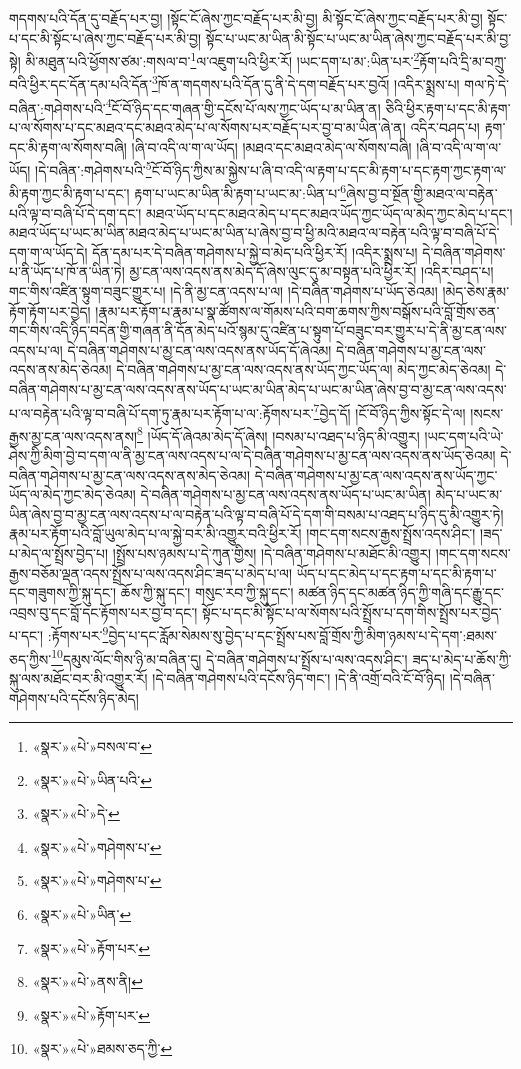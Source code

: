 གདགས་པའི་དོན་དུ་བརྗོད་པར་བྱ། །སྟོང་ངོ་ཞེས་ཀྱང་བརྗོད་པར་མི་བྱ། མི་སྟོང་ངོ་ཞེས་ཀྱང་བརྗོད་པར་མི་བྱ། སྟོང་པ་དང་མི་སྟོང་པ་ཞེས་ཀྱང་བརྗོད་པར་མི་བྱ། སྟོང་པ་ཡང་མ་ཡིན་མི་སྟོང་པ་ཡང་མ་ཡིན་ཞེས་ཀྱང་བརྗོད་པར་མི་བྱ་སྟེ། མི་མཐུན་པའི་ཕྱོགས་ཙམ་:གསལ་བ་\footnote{«སྣར་»«པེ་»བསལ་བ་}ལ་འཇུག་པའི་ཕྱིར་རོ། །ཡང་དག་པ་མ་:ཡིན་པར་\footnote{«སྣར་»«པེ་»ཡིན་པའི་}རྟོག་པའི་དྲི་མ་བཀྲུ་བའི་ཕྱིར་དང་དོན་དམ་པའི་དོན་\footnote{«སྣར་»«པེ་»དེ་}ཁོ་ན་གདགས་པའི་དོན་དུ་ནི་དེ་དག་བརྗོད་པར་བྱའོ། །འདིར་སྨྲས་པ། གལ་ཏེ་དེ་བཞིན་:གཤེགས་པའི་\footnote{«སྣར་»«པེ་»གཤེགས་པ་}ངོ་བོ་ཉིད་དང་གཞན་གྱི་དངོས་པོ་ལས་ཀྱང་ཡོད་པ་མ་ཡིན་ན། ཅིའི་ཕྱིར་རྟག་པ་དང་མི་རྟག་པ་ལ་སོགས་པ་དང་མཐའ་དང་མཐའ་མེད་པ་ལ་སོགས་པར་བརྗོད་པར་བྱ་བ་མ་ཡིན་ཞེ་ན། འདིར་བཤད་པ། རྟག་དང་མི་རྟག་ལ་སོགས་བཞི། །ཞི་བ་འདི་ལ་ག་ལ་ཡོད། །མཐའ་དང་མཐའ་མེད་ལ་སོགས་བཞི། །ཞི་བ་འདི་ལ་ག་ལ་ཡོད། །དེ་བཞིན་:གཤེགས་པའི་\footnote{«སྣར་»«པེ་»གཤེགས་པ་}ངོ་བོ་ཉིད་ཀྱིས་མ་སྐྱེས་པ་ཞི་བ་འདི་ལ་རྟག་པ་དང་མི་རྟག་པ་དང་རྟག་ཀྱང་རྟག་ལ་མི་རྟག་ཀྱང་མི་རྟག་པ་དང་། རྟག་པ་ཡང་མ་ཡིན་མི་རྟག་པ་ཡང་མ་:ཡིན་པ་\footnote{«སྣར་»«པེ་»ཡིན་}ཞེས་བྱ་བ་སྔོན་གྱི་མཐའ་ལ་བརྟེན་པའི་ལྟ་བ་བཞི་པོ་དེ་དག་དང་། མཐའ་ཡོད་པ་དང་མཐའ་མེད་པ་དང་མཐའ་ཡོད་ཀྱང་ཡོད་ལ་མེད་ཀྱང་མེད་པ་དང་། མཐའ་ཡོད་པ་ཡང་མ་ཡིན་མཐའ་མེད་པ་ཡང་མ་ཡིན་པ་ཞེས་བྱ་བ་ཕྱི་མའི་མཐའ་ལ་བརྟེན་པའི་ལྟ་བ་བཞི་པོ་དེ་དག་ག་ལ་ཡོད་དེ། དོན་དམ་པར་དེ་བཞིན་གཤེགས་པ་སྐྱེ་བ་མེད་པའི་ཕྱིར་རོ། །འདིར་སྨྲས་པ། དེ་བཞིན་གཤེགས་པ་ནི་ཡོད་པ་ཁོ་ན་ཡིན་ཏེ། མྱ་ངན་ལས་འདས་ནས་མེད་དོ་ཞེས་ལུང་དུ་མ་བསྟན་པའི་ཕྱིར་རོ། །འདིར་བཤད་པ། གང་གིས་འཛིན་སྟུག་བཟུང་གྱུར་པ། །དེ་ནི་མྱ་ངན་འདས་པ་ལ། །དེ་བཞིན་གཤེགས་པ་ཡོད་ཅེའམ། །མེད་ཅེས་རྣམ་རྟོག་རྟོག་པར་བྱེད། །རྣམ་པར་རྟོག་པ་རྣམ་པ་སྣ་ཚོགས་ལ་གོམས་པའི་བག་ཆགས་ཀྱིས་བསྒོས་པའི་བློ་གྲོས་ཅན་གང་གིས་འདི་ཉིད་བདེན་གྱི་གཞན་ནི་དོན་མེད་པའོ་སྙམ་དུ་འཛིན་པ་སྟུག་པོ་བཟུང་བར་གྱུར་པ་དེ་ནི་མྱ་ངན་ལས་འདས་པ་ལ། དེ་བཞིན་གཤེགས་པ་མྱ་ངན་ལས་འདས་ནས་ཡོད་དོ་ཞེའམ། དེ་བཞིན་གཤེགས་པ་མྱ་ངན་ལས་འདས་ནས་མེད་ཅེའམ། དེ་བཞིན་གཤེགས་པ་མྱ་ངན་ལས་འདས་ནས་ཡོད་ཀྱང་ཡོད་ལ། མེད་ཀྱང་མེད་ཅེའམ། དེ་བཞིན་གཤེགས་པ་མྱ་ངན་ལས་འདས་ནས་ཡོད་པ་ཡང་མ་ཡིན་མེད་པ་ཡང་མ་ཡིན་ཞེས་བྱ་བ་མྱ་ངན་ལས་འདས་པ་ལ་བརྟེན་པའི་ལྟ་བ་བཞི་པོ་དག་ཏུ་རྣམ་པར་རྟོག་པ་ལ་:རྟོགས་པར་\footnote{«སྣར་»«པེ་»རྟོག་པར་}བྱེད་དོ། །ངོ་བོ་ཉིད་ཀྱིས་སྟོང་དེ་ལ། །སངས་རྒྱས་མྱ་ངན་ལས་འདས་ནས།\footnote{«སྣར་»«པེ་»ནས་ནི།} །ཡོད་དོ་ཞེའམ་མེད་དོ་ཞེས། །བསམ་པ་འཐད་པ་ཉིད་མི་འགྱུར། །ཡང་དག་པའི་ཡེ་ཤེས་ཀྱི་མིག་བྱེ་བ་དག་ལ་ནི་མྱ་ངན་ལས་འདས་པ་ལ་དེ་བཞིན་གཤེགས་པ་མྱ་ངན་ལས་འདས་ནས་ཡོད་ཅེའམ། དེ་བཞིན་གཤེགས་པ་མྱ་ངན་ལས་འདས་ནས་མེད་ཅེའམ། དེ་བཞིན་གཤེགས་པ་མྱ་ངན་ལས་འདས་ནས་ཡོད་ཀྱང་ཡོད་ལ་མེད་ཀྱང་མེད་ཅེའམ། དེ་བཞིན་གཤེགས་པ་མྱ་ངན་ལས་འདས་ནས་ཡོད་པ་ཡང་མ་ཡིན། མེད་པ་ཡང་མ་ཡིན་ཞེས་བྱ་བ་མྱ་ངན་ལས་འདས་པ་ལ་བརྟེན་པའི་ལྟ་བ་བཞི་པོ་དེ་དག་གི་བསམ་པ་འཐད་པ་ཉིད་དུ་མི་འགྱུར་ཏེ། རྣམ་པར་རྟོག་པའི་བློ་ཡུལ་མེད་པ་ལ་སྐྱེ་བར་མི་འགྱུར་བའི་ཕྱིར་རོ། །གང་དག་སངས་རྒྱས་སྤྲོས་འདས་ཤིང་། །ཟད་པ་མེད་ལ་སྤྲོས་བྱེད་པ། །སྤྲོས་པས་ཉམས་པ་དེ་ཀུན་གྱིས། །དེ་བཞིན་གཤེགས་པ་མཐོང་མི་འགྱུར། །གང་དག་སངས་རྒྱས་བཅོམ་ལྡན་འདས་སྤྲོས་པ་ལས་འདས་ཤིང་ཟད་པ་མེད་པ་ལ། ཡོད་པ་དང་མེད་པ་དང་རྟག་པ་དང་མི་རྟག་པ་དང་གཟུགས་ཀྱི་སྐུ་དང་། ཆོས་ཀྱི་སྐུ་དང་། གསུང་རབ་ཀྱི་སྐུ་དང་། མཚན་ཉིད་དང་མཚན་ཉིད་ཀྱི་གཞི་དང་རྒྱུ་དང་འབྲས་བུ་དང་བློ་དང་རྟོགས་པར་བྱ་བ་དང་། སྟོང་པ་དང་མི་སྟོང་པ་ལ་སོགས་པའི་སྤྲོས་པ་དག་གིས་སྤྲོས་པར་བྱེད་པ་དང་། :རྟོགས་པར་\footnote{«སྣར་»«པེ་»རྟོག་པར་}བྱེད་པ་དང་རློམ་སེམས་སུ་བྱེད་པ་དང་སྤྲོས་པས་བློ་གྲོས་ཀྱི་མིག་ཉམས་པ་དེ་དག་:ཐམས་ཅད་ཀྱིས་\footnote{«སྣར་»«པེ་»ཐམས་ཅད་ཀྱི་}དམུས་ལོང་གིས་ཉི་མ་བཞིན་དུ། དེ་བཞིན་གཤེགས་པ་སྤྲོས་པ་ལས་འདས་ཤིང་། ཟད་པ་མེད་པ་ཆོས་ཀྱི་སྐུ་ལས་མཐོང་བར་མི་འགྱུར་རོ། །དེ་བཞིན་གཤེགས་པའི་དངོས་ཉིད་གང་། །དེ་ནི་འགྲོ་བའི་ངོ་བོ་ཉིད། །དེ་བཞིན་གཤེགས་པའི་དངོས་ཉིད་མེད། 